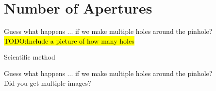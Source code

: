 \section{Number of Apertures}
\begin{frame}{Guess what happens}
  ... if we make multiple holes around the pinhole?\\
  \hl{TODO:Include a picture of how many holes}
\end{frame}

\begin{frame}[fragile]{Scientific method}
  
\end{frame}

\begin{frame}{Guess what happens}
  ... if we make multiple holes around the pinhole?\\
  \pause
  {\color{red} Did you get multiple images?}
\end{frame}


